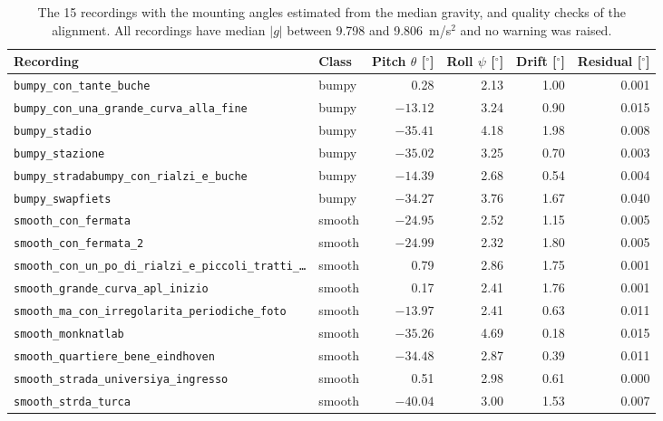\documentclass[10pt,a4paper]{article}
\begin{document}
\begin{table}[!htbp]
\centering
\caption{The 15 recordings with the mounting angles estimated from the median gravity, and quality checks of the alignment. All recordings have median $|g|$ between 9.798 and 9.806~m/s$^2$ and no warning was raised.}
\label{tab:rec}
\scriptsize
\begin{tabular}{llrrrr}
\toprule
Recording & Class & Pitch $\theta$ [$^\circ$] & Roll $\psi$ [$^\circ$] & Drift [$^\circ$] & Residual [$^\circ$]\\
\midrule
\texttt{bumpy\_con\_tante\_buche} & bumpy & 0.28 & 2.13 & 1.00 & 0.001\\
\texttt{bumpy\_con\_una\_grande\_curva\_alla\_fine} & bumpy & $-13.12$ & 3.24 & 0.90 & 0.015\\
\texttt{bumpy\_stadio} & bumpy & $-35.41$ & 4.18 & 1.98 & 0.008\\
\texttt{bumpy\_stazione} & bumpy & $-35.02$ & 3.25 & 0.70 & 0.003\\
\texttt{bumpy\_stradabumpy\_con\_rialzi\_e\_buche} & bumpy & $-14.39$ & 2.68 & 0.54 & 0.004\\
\texttt{bumpy\_swapfiets} & bumpy & $-34.27$ & 3.76 & 1.67 & 0.040\\
\texttt{smooth\_con\_fermata} & smooth & $-24.95$ & 2.52 & 1.15 & 0.005\\
\texttt{smooth\_con\_fermata\_2} & smooth & $-24.99$ & 2.32 & 1.80 & 0.005\\
\texttt{smooth\_con\_un\_po\_di\_rialzi\_e\_piccoli\_tratti\_\dots} & smooth & 0.79 & 2.86 & 1.75 & 0.001\\
\texttt{smooth\_grande\_curva\_apl\_inizio} & smooth & 0.17 & 2.41 & 1.76 & 0.001\\
\texttt{smooth\_ma\_con\_irregolarita\_periodiche\_foto} & smooth & $-13.97$ & 2.41 & 0.63 & 0.011\\
\texttt{smooth\_monknatlab} & smooth & $-35.26$ & 4.69 & 0.18 & 0.015\\
\texttt{smooth\_quartiere\_bene\_eindhoven} & smooth & $-34.48$ & 2.87 & 0.39 & 0.011\\
\texttt{smooth\_strada\_universiya\_ingresso} & smooth & 0.51 & 2.98 & 0.61 & 0.000\\
\texttt{smooth\_strda\_turca} & smooth & $-40.04$ & 3.00 & 1.53 & 0.007\\
\bottomrule
\end{tabular}
\end{table}
\end{document}
